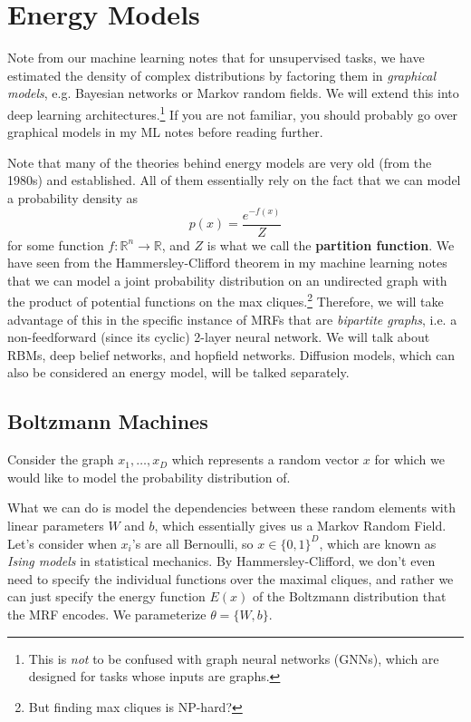 \section{Energy Models} 

  Note from our machine learning notes that for unsupervised tasks, we have estimated the density of complex distributions by factoring them in \textit{graphical models}, e.g. Bayesian networks or Markov random fields. We will extend this into deep learning architectures.\footnote{This is \textit{not} to be confused with graph neural networks (GNNs), which are designed for tasks whose inputs are graphs.} If you are not familiar, you should probably go over graphical models in my ML notes before reading further. 

  Note that many of the theories behind energy models are very old (from the 1980s) and established. All of them essentially rely on the fact that we can model a probability density as 
  \begin{equation}
    p(x) = \frac{e^{-f(x)}}{Z}
  \end{equation}
  for some function $f: \mathbb{R}^n \rightarrow \mathbb{R}$, and $Z$ is what we call the \textbf{partition function}. We have seen from the Hammersley-Clifford theorem in my machine learning notes that we can model a joint probability distribution on an undirected graph with the product of potential functions on the max cliques.\footnote{But finding max cliques is NP-hard?} Therefore, we will take advantage of this in the specific instance of MRFs that are \textit{bipartite graphs}, i.e. a non-feedforward (since its cyclic) 2-layer neural network. We will talk about RBMs, deep belief networks, and hopfield networks. Diffusion models, which can also be considered an energy model, will be talked separately. 

\subsection{Boltzmann Machines} 

  Consider the graph $x_1, \ldots, x_D$ which represents a random vector $x$ for which we would like to model the probability distribution of. 
  \begin{center}
  \end{center}
  What we can do is model the dependencies between these random elements with linear parameters $W$ and $b$, which essentially gives us a Markov Random Field. Let's consider when $x_i$'s are all Bernoulli, so $x \in \{0, 1\}^D$, which are known as \textit{Ising models} in statistical mechanics. By Hammersley-Clifford, we don't even need to specify the individual functions over the maximal cliques, and rather we can just specify the energy function $E(x)$ of the Boltzmann distribution that the MRF encodes. We parameterize $\theta = \{W, b\}$. 

